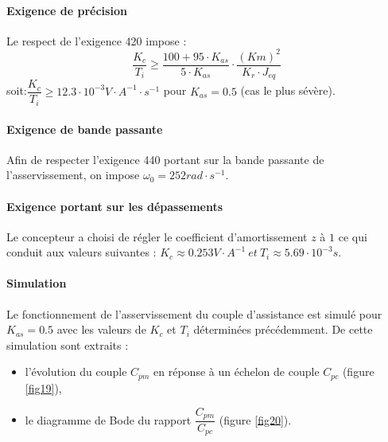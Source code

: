 \paragraph{Exigence de précision} Le respect de l’exigence 420 impose :
$$\dfrac{K_c}{T_i}\geq \dfrac{100+95\cdot K_{as}}{5\cdot K_{as}}\cdot\dfrac{(Km)^2}{K_r\cdot J_{eq}}$$
soit:$\dfrac{K_c}{T_i}\geq 12.3\cdot 10^{-3}V\cdot A^{-1}\cdot s^{-1}$ pour $K_{as}=0.5$ (cas le plus sévère).

\paragraph{Exigence de bande passante} Afin de respecter l’exigence 440 portant sur la bande passante de l’asservissement, on impose $\omega_0=252rad\cdot s^{-1}$.



\paragraph{Exigence portant sur les dépassements} Le concepteur a choisi de régler le coefficient d’amortissement $z$ à $1$ ce qui conduit aux valeurs suivantes : $K_c \approx 0.253 V\cdot A^{-1}\ et\  T_i\approx 5.69\cdot 10^{-3} s$.

\paragraph{Simulation} Le fonctionnement de l’asservissement du couple d’assistance est simulé pour $K_{as}=0.5$ avec les valeurs de $K_c$ et $T_i$ déterminées précédemment. De cette simulation sont extraits :
\begin{itemize}
 \item l’évolution du couple $C_{pm}$ en réponse à un échelon de couple $C_{pc}$ (figure \ref{fig19}),
 \item le diagramme de Bode du rapport $\dfrac{C_{pm}}{C_{pc}}$ (figure \ref{fig20}).
\end{itemize}



